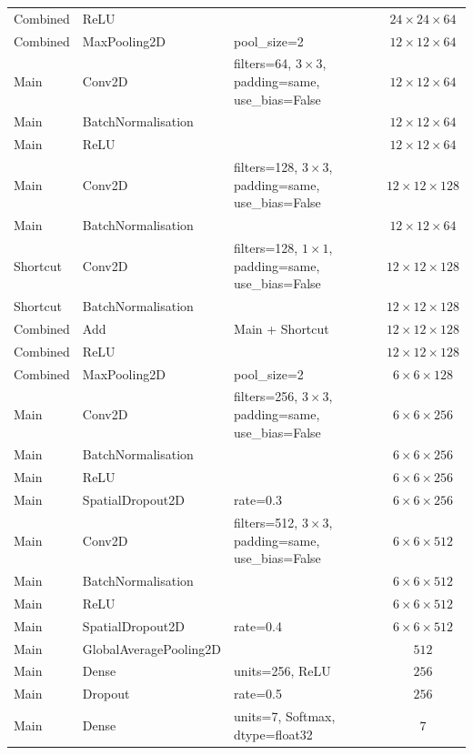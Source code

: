 \documentclass[12pt, a4paper]{report}
\begin{document}
\begin{longtable}{llp{6cm}c}
					Combined & ReLU &  & $24\times24\times64$ \\
					Combined & MaxPooling2D & pool\_size=2 & $12\times12\times64$ \\
					\midrule
					Main & Conv2D & filters=64, $3\times3$, padding=same, use\_bias=False & $12\times12\times64$ \\
					Main & BatchNormalisation &  & $12\times12\times64$ \\
					Main & ReLU &  & $12\times12\times64$ \\
					Main & Conv2D & filters=128, $3\times3$, padding=same, use\_bias=False & $12\times12\times128$ \\
					Main & BatchNormalisation &  & $12\times12\times64$ \\
					\midrule
					Shortcut & Conv2D & filters=128, $1\times1$, padding=same, use\_bias=False & $12\times12\times128$ \\
					Shortcut & BatchNormalisation &  & $12\times12\times128$ \\
					Combined & Add & Main + Shortcut & $12\times12\times128$ \\
					Combined & ReLU &  & $12\times12\times128$ \\
					Combined & MaxPooling2D & pool\_size=2 & $6\times6\times128$ \\
					\midrule
					Main & Conv2D & filters=256, $3\times3$, padding=same, use\_bias=False & $6\times6\times256$ \\
					Main & BatchNormalisation &  & $6\times6\times256$ \\
					Main & ReLU &  & $6\times6\times256$ \\
					Main & SpatialDropout2D & rate=0.3 & $6\times6\times256$ \\
					Main & Conv2D & filters=512, $3\times3$, padding=same, use\_bias=False & $6\times6\times512$ \\
					Main & BatchNormalisation &  & $6\times6\times512$ \\
					Main & ReLU &  & $6\times6\times512$ \\
					Main & SpatialDropout2D & rate=0.4 & $6\times6\times512$ \\
					Main & GlobalAveragePooling2D &  & $512$ \\
					Main & Dense & units=256, ReLU & $256$ \\
					Main & Dropout & rate=0.5 & $256$ \\
					Main & Dense & units=7, Softmax, dtype=float32 & $7$ \\
				\end{longtable}
			
\end{document}
